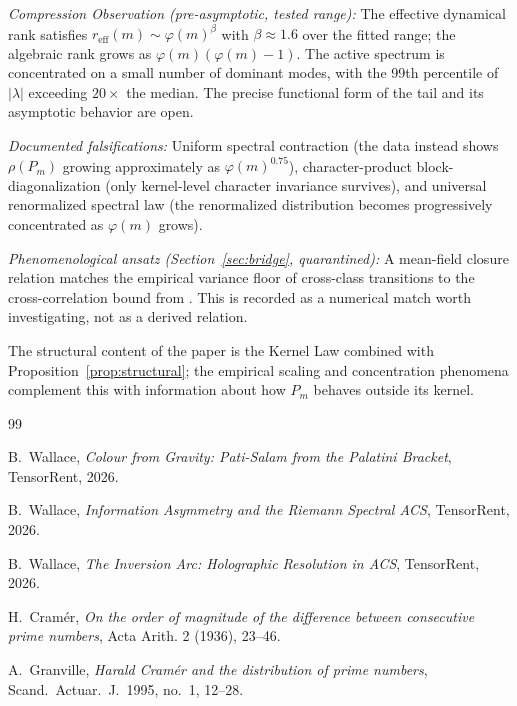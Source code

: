 \documentclass[11pt,a4paper]{article}
\begin{document}
\emph{Compression Observation (pre-asymptotic, tested range):} The effective dynamical rank satisfies $r_{\text{eff}}(m) \sim \varphi(m)^{\beta}$ with $\beta \approx 1.6$ over the fitted range; the algebraic rank grows as $\varphi(m)(\varphi(m) - 1)$. The active spectrum is concentrated on a small number of dominant modes, with the 99th percentile of $|\lambda|$ exceeding $20 \times$ the median. The precise functional form of the tail and its asymptotic behavior are open.

\emph{Documented falsifications:} Uniform spectral contraction (the data instead shows $\rho(P_m)$ growing approximately as $\varphi(m)^{0.75}$), character-product block-diagonalization (only kernel-level character invariance survives), and universal renormalized spectral law (the renormalized distribution becomes progressively concentrated as $\varphi(m)$ grows).

\emph{Phenomenological ansatz (Section~\ref{sec:bridge}, quarantined):} A mean-field closure relation matches the empirical variance floor of cross-class transitions to the cross-correlation bound from \cite{WallaceB}. This is recorded as a numerical match worth investigating, not as a derived relation.

The structural content of the paper is the Kernel Law combined with Proposition~\ref{prop:structural}; the empirical scaling and concentration phenomena complement this with information about how $P_m$ behaves outside its kernel.

\begin{thebibliography}{99}

B.~Wallace,
\emph{Colour from Gravity: Pati-Salam from the Palatini Bracket},
TensorRent, 2026.

B.~Wallace,
\emph{Information Asymmetry and the Riemann Spectral ACS},
TensorRent, 2026.

B.~Wallace,
\emph{The Inversion Arc: Holographic Resolution in ACS},
TensorRent, 2026.

H.~Cram\'{e}r,
\emph{On the order of magnitude of the difference between consecutive prime numbers},
Acta Arith. 2 (1936), 23--46.

A.~Granville,
\emph{Harald Cram\'{e}r and the distribution of prime numbers},
Scand.\ Actuar.\ J.\ 1995, no.~1, 12--28.

\end{thebibliography}
\end{document}
